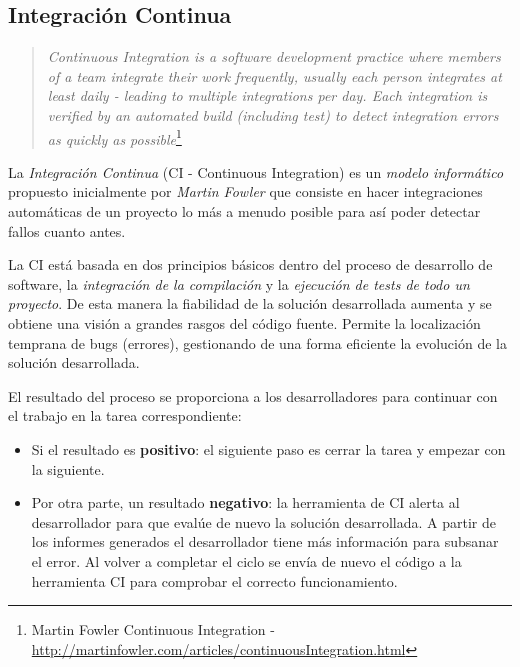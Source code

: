 
\subsection{Integración Continua}
\label{sub:integracion-continua}

\begin{quote}
    \emph{Continuous Integration is a software development practice where members of a team integrate their work frequently, usually each person integrates at least daily - leading to multiple integrations per day. Each integration is verified by an automated build (including test) to detect integration errors as quickly as possible}\footnote{Martin Fowler Continuous Integration - \url{http://martinfowler.com/articles/continuousIntegration.html}}
\end{quote}

\par La \emph{Integración Continua} (CI - Continuous Integration) es un \emph{modelo informático} propuesto inicialmente por \emph{Martin Fowler} que consiste en hacer integraciones automáticas de un proyecto lo más a menudo posible para así poder detectar fallos cuanto antes.

\par La CI está basada en dos principios básicos dentro del proceso de desarrollo de software, la \emph{integración de la compilación} y la \emph{ejecución de tests de todo un proyecto}. De esta manera la fiabilidad de la solución desarrollada aumenta y se obtiene una visión a grandes rasgos del código fuente. Permite la localización temprana de bugs (errores), gestionando de una forma eficiente la evolución de la solución desarrollada.

\par El resultado del proceso se proporciona a los desarrolladores para continuar con el trabajo en la tarea correspondiente:

\begin{itemize}
	\item Si el resultado es \textbf{positivo}: el siguiente paso es cerrar la tarea y empezar con la siguiente.
	\item Por otra parte, un resultado \textbf{negativo}: la herramienta de CI alerta al desarrollador para que evalúe de nuevo la solución desarrollada. A partir de los informes generados el desarrollador tiene más información para subsanar el error. Al volver a completar el ciclo se envía de nuevo el código a la herramienta CI para comprobar el correcto funcionamiento.
\end{itemize}

